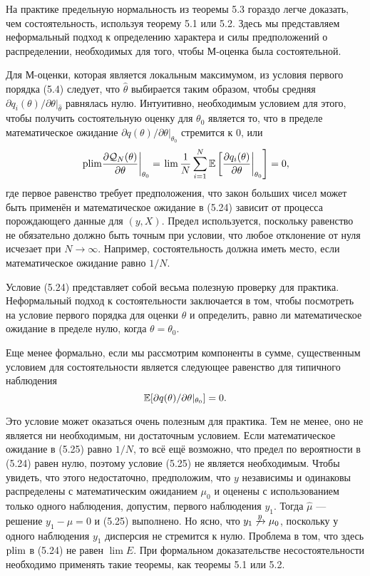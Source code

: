 На практике предельную нормальность из теоремы 5.3 гораздо легче доказать, чем состоятельность, используя теорему 5.1 или 5.2. Здесь мы представляем неформальный подход к определению характера и силы предположений о распределении, необходимых для того, чтобы М-оценка была состоятельной.

Для М-оценки, которая является локальным максимумом, из условия первого порядка (5.4) следует, что $\hat{\theta}$ выбирается таким образом, чтобы средняя $\partial q_i(\theta) / \partial \theta |_{\hat{\theta}}$ равнялась нулю. Интуитивно, необходимым условием для этого, чтобы получить состоятельную оценку для $\theta_0$ является то, что в пределе математическое ожидание $\partial q(\theta) / \partial \theta |_{\theta_0}$ стремится к 0, или 
\begin{equation}
\left. \mathrm{plim } \frac{\partial \mathcal{Q}_N(\theta)} {\partial \theta} \right|_{\theta_0}= \left. \lim \frac{1}{N} \sum_{i=1}^{N} \mathbb{E} \left[ \frac{\partial q_i(\theta)}{\partial \theta} \right|_{\theta_0} \right] =0,
\end{equation}
где первое равенство требует предположения, что закон больших чисел может быть применён и математическое ожидание в (5.24) зависит от процесса порождающего данные для $(y,X)$. Предел используется, поскольку равенство не обязательно должно быть точным при условии, что любое отклонение от нуля исчезает при $N \rightarrow \infty$. Например, состоятельность должна иметь место, если математическое ожидание равно $1/N$.

Условие (5.24) представляет собой весьма полезную проверку для практика. Неформальный подход к состоятельности заключается в том, чтобы посмотреть на условие первого порядка для оценки $\hat{\theta}$ и определить, равно ли математическое ожидание в пределе нулю, когда $\theta=\theta_0$.

Еще менее формально, если мы рассмотрим компоненты в сумме, существенным условием для состоятельности является следующее равенство для типичного наблюдения
\begin{equation}
\mathbb{E}[\partial q(\theta)/ \partial \theta|_{\theta_0}]=0.
\end{equation}

Это условие может оказаться очень полезным для практика. Тем не менее, оно не является ни необходимым, ни достаточным условием. Если математическое ожидание в (5.25) равно $1/N$, то всё ещё возможно, что предел по вероятности в (5.24) равен нулю, поэтому условие (5.25) не является необходимым. Чтобы увидеть, что этого недостаточно, предположим, что $y$ независимы и одинаковы распределены с математическим ожиданием $\mu_0$ и оценены с использованием только одного наблюдения, допустим, первого наблюдения $y_1$. Тогда $\hat{\mu}$ --- решение $y_1-\mu=0$ и (5.25) выполнено. Но ясно, что $y_1 \not \xrightarrow{p} \mu_0$, поскольку у одного наблюдения $y_1$ дисперсия не стремится к нулю. Проблема в том, что здесь $\mathrm{plim }$ в (5.24) не равен $\lim E$. При формальном доказательстве несостоятельности необходимо применять такие теоремы, как теоремы 5.1 или 5.2.

